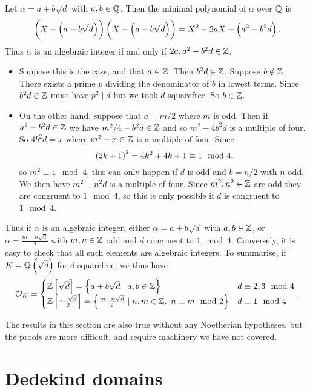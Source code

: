 Let $ \alpha = a + b\sqrt{d} $ with $ a, b \in \mathbb{Q} $. Then the minimal polynomial of $ \alpha $ over $ \mathbb{Q} $ is
$$ \br{X - \br{a + b\sqrt{d}}}\br{X - \br{a - b\sqrt{d}}} = X^2 - 2aX + \br{a^2 - b^2d}. $$
Thus $ \alpha $ is an algebraic integer if and only if $ 2a, a^2 - b^2d \in \mathbb{Z} $.
\begin{itemize}
\item Suppose this is the case, and that $ a \in \mathbb{Z} $. Then $ b^2d \in \mathbb{Z} $. Suppose $ b \notin \mathbb{Z} $. There exists a prime $ p $ dividing the denominator of $ b $ in lowest terms. Since $ b^2d \in \mathbb{Z} $ must have $ p^2 \mid d $ but we took $ d $ squarefree. So $ b \in \mathbb{Z} $.
\item On the other hand, suppose that $ a = m / 2 $ where $ m $ is odd. Then if $ a^2 - b^2d \in \mathbb{Z} $ we have $ m^2 / 4 - b^2d \in \mathbb{Z} $ and so $ m^2 - 4b^2d $ is a multiple of four. So $ 4b^2d = x $ where $ m^2 - x \in \mathbb{Z} $ is a multiple of four. Since
$$ \br{2k + 1}^2 = 4k^2 + 4k + 1 \equiv 1 \mod 4, $$
so $ m^2 \equiv 1 \mod 4 $, this can only happen if $ d $ is odd and $ b = n / 2 $ with $ n $ odd. We then have $ m^2 - n^2d $ is a multiple of four. Since $ m^2, n^2 \in \mathbb{Z} $ are odd they are congruent to $ 1 \mod 4 $, so this is only possible if $ d $ is congruent to $ 1 \mod 4 $.
\end{itemize}
Thus if $ \alpha $ is an algebraic integer, either $ \alpha = a + b\sqrt{d} $ with $ a, b \in \mathbb{Z} $, or $ \alpha = \tfrac{m + n\sqrt{d}}{2} $ with $ m, n \in \mathbb{Z} $ odd and $ d $ congruent to $ 1 \mod 4 $. Conversely, it is easy to check that all such elements are algebraic integers. To summarise, if $ K = \Q\br{\sqrt{d}} $ for $ d $ squarefree, we thus have
$$ \OO_K =
\begin{cases}
\Z\sbr{\sqrt{d}} = \cbr{a + b\sqrt{d} \mid a, b \in \Z} & d \equiv 2, 3 \mod 4 \\
\Z\sbr{\tfrac{1 + \sqrt{d}}{2}} = \cbr{\tfrac{m + n\sqrt{d}}{2} \mid n, m \in \Z, \ n \equiv m \mod 2} & d \equiv 1 \mod 4
\end{cases}.
$$

\begin{note*}
The results in this section are also true without any Noetherian hypotheses, but the proofs are more difficult, and require machinery we have not covered.
\end{note*}

\pagebreak

\section{Dedekind domains}

